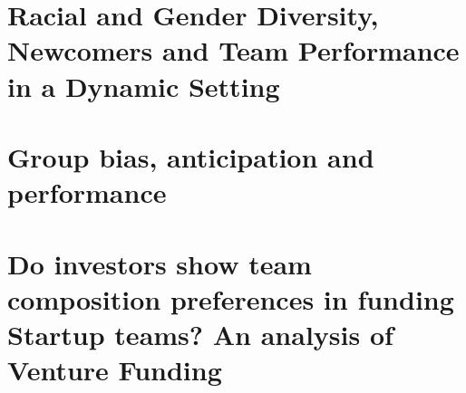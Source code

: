 \documentclass[12pt,letterpaper]{article}
\begin{document}
\thispagestyle{empty} %

\clearpage

\thispagestyle{empty} %

\clearpage





\tableofcontents
\clearpage

\thispagestyle{empty} 

\clearpage

\part{Racial and Gender Diversity, Newcomers and Team Performance in a Dynamic Setting}

\clearpage


\part{Group bias, anticipation and performance}

\clearpage

\part{Do investors show team composition preferences in funding Startup teams? An analysis of Venture Funding}

\clearpage


\clearpage
\end{document}
